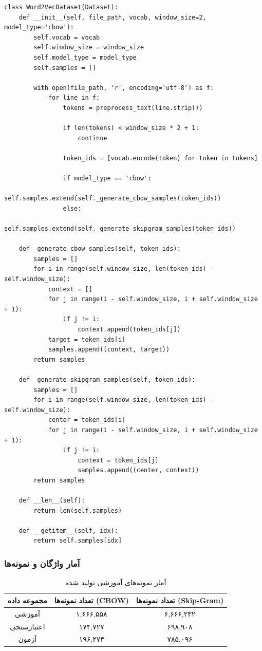 \documentclass[12pt,a4paper]{article}
\begin{document}
\begin{lstlisting}[caption=کد تولید نمونه‌های آموزشی]
class Word2VecDataset(Dataset):
    def __init__(self, file_path, vocab, window_size=2, model_type='cbow'):
        self.vocab = vocab
        self.window_size = window_size
        self.model_type = model_type
        self.samples = []

        with open(file_path, 'r', encoding='utf-8') as f:
            for line in f:
                tokens = preprocess_text(line.strip())

                if len(tokens) < window_size * 2 + 1:
                    continue

                token_ids = [vocab.encode(token) for token in tokens]

                if model_type == 'cbow':
                    self.samples.extend(self._generate_cbow_samples(token_ids))
                else:
                    self.samples.extend(self._generate_skipgram_samples(token_ids))

    def _generate_cbow_samples(self, token_ids):
        samples = []
        for i in range(self.window_size, len(token_ids) - self.window_size):
            context = []
            for j in range(i - self.window_size, i + self.window_size + 1):
                if j != i:
                    context.append(token_ids[j])
            target = token_ids[i]
            samples.append((context, target))
        return samples

    def _generate_skipgram_samples(self, token_ids):
        samples = []
        for i in range(self.window_size, len(token_ids) - self.window_size):
            center = token_ids[i]
            for j in range(i - self.window_size, i + self.window_size + 1):
                if j != i:
                    context = token_ids[j]
                    samples.append((center, context))
        return samples

    def __len__(self):
        return len(self.samples)

    def __getitem__(self, idx):
        return self.samples[idx]
\end{lstlisting}

\subsubsection{آمار واژگان و نمونه‌ها}
\begin{table}[H]
\centering
\begin{tabular}{|c|c|c|}
\hline
\textbf{مجموعه داده} & \textbf{تعداد نمونه‌ها (CBOW)} & \textbf{تعداد نمونه‌ها (Skip-Gram)} \\
\hline
آموزشی & ۱,۶۶۶,۵۵۸ & ۶,۶۶۶,۲۳۲ \\
اعتبارسنجی & ۱۷۴,۷۲۷ & ۶۹۸,۹۰۸ \\
آزمون & ۱۹۶,۲۷۴ & ۷۸۵,۰۹۶ \\
\hline
\end{tabular}
\caption{آمار نمونه‌های آموزشی تولید شده}
\end{table}
\end{document}
